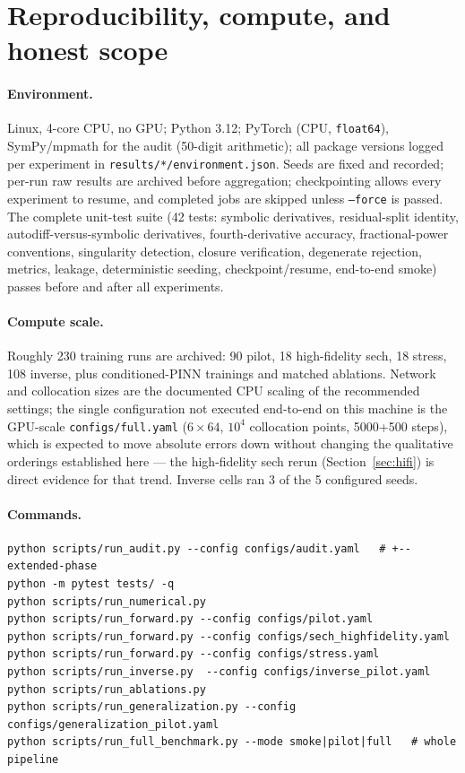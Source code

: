 \documentclass[11pt,a4paper]{article}
\begin{document}
\section{Reproducibility, compute, and honest scope}
\label{sec:repro}

\paragraph{Environment.} Linux, 4-core CPU, no GPU; Python 3.12; PyTorch
(CPU, \texttt{float64}), SymPy/mpmath for the audit (50-digit arithmetic);
all package versions logged per experiment in
\texttt{results/*/environment.json}. Seeds are fixed and recorded; per-run raw
results are archived before aggregation; checkpointing allows every experiment
to resume, and completed jobs are skipped unless \texttt{--force} is passed.
The complete unit-test suite (42 tests: symbolic derivatives, residual-split
identity, autodiff-versus-symbolic derivatives, fourth-derivative accuracy,
fractional-power conventions, singularity detection, closure verification,
degenerate rejection, metrics, leakage, deterministic seeding,
checkpoint/resume, end-to-end smoke) passes before and after all experiments.

\paragraph{Compute scale.} Roughly 230 training runs are archived: 90 pilot,
18 high-fidelity sech, 18 stress, 108 inverse, plus conditioned-PINN
trainings and matched ablations. Network and collocation sizes are the
documented CPU scaling of the recommended settings; the single configuration
not executed end-to-end on this machine is the GPU-scale
\texttt{configs/full.yaml} ($6\times64$, $10^4$ collocation points, 5000+500
steps), which is expected to move absolute errors down without changing the
qualitative orderings established here --- the high-fidelity sech rerun
(Section~\ref{sec:hifi}) is direct evidence for that trend. Inverse cells ran
3 of the 5 configured seeds.

\paragraph{Commands.}
\begin{verbatim}
python scripts/run_audit.py --config configs/audit.yaml   # +--extended-phase
python -m pytest tests/ -q
python scripts/run_numerical.py
python scripts/run_forward.py --config configs/pilot.yaml
python scripts/run_forward.py --config configs/sech_highfidelity.yaml
python scripts/run_forward.py --config configs/stress.yaml
python scripts/run_inverse.py  --config configs/inverse_pilot.yaml
python scripts/run_ablations.py
python scripts/run_generalization.py --config configs/generalization_pilot.yaml
python scripts/run_full_benchmark.py --mode smoke|pilot|full   # whole pipeline
\end{verbatim}
\end{document}
